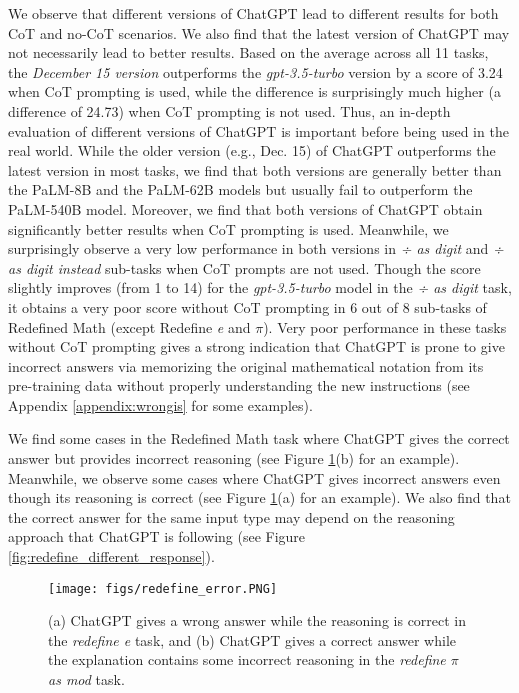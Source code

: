 \documentclass[11pt]{article}
\begin{document}
We observe that different versions of ChatGPT lead to different results for both CoT and no-CoT scenarios. We also find that the latest version of ChatGPT may not necessarily lead to better results. Based on the average across all 11 tasks, the \textit{December 15 version} outperforms the \textit{gpt-3.5-turbo} version by a score of 3.24 when CoT prompting is used, while the difference is surprisingly much higher (a difference of 24.73) when CoT prompting is not used. Thus, an in-depth evaluation of different versions of ChatGPT is important before being used in the real world. While the older version (e.g., Dec. 15) of ChatGPT outperforms the latest version in most tasks, we find that both versions are generally better than the PaLM-8B and the PaLM-62B models but usually fail to outperform the PaLM-540B model. Moreover, we find that both versions of ChatGPT obtain significantly better results when CoT prompting is used. Meanwhile, we surprisingly observe a very low performance in both versions in \textit{÷ as digit} and \textit{÷ as digit instead} sub-tasks when CoT prompts are not used. Though the score slightly improves (from 1 to 14) for the \textit{gpt-3.5-turbo} model in the \textit{÷ as digit} task, it obtains a very poor score without CoT prompting in 6 out of 8 sub-tasks of Redefined Math (except Redefine \textit{e} and $\pi$). Very poor performance in these tasks without CoT prompting gives a strong indication that ChatGPT is prone to give incorrect answers via memorizing the original mathematical notation from its pre-training data without properly understanding the new instructions (see Appendix \ref{appendix:wrongis} for some examples). 

We find some cases in the Redefined Math task where ChatGPT gives the correct answer but provides incorrect reasoning (see Figure \ref{fig:redefine_error}(b) for an example). Meanwhile, we observe some cases where ChatGPT gives incorrect answers even though its reasoning is correct (see Figure \ref{fig:redefine_error}(a) for an example). We also find that the correct answer for the same input type may depend on the reasoning approach that ChatGPT is following (see Figure \ref{fig:redefine_different_response}). 



\begin{figure}[t!]

\begin{center}
\texttt{[image: figs/redefine\_error.PNG]}
\caption[overview]{
\small{(a) ChatGPT gives a wrong answer while the reasoning is correct in the \textit{redefine e} task, and (b) ChatGPT gives a correct answer while the explanation contains some incorrect reasoning in the \textit{redefine $\pi$ as mod} task.} }
\label{fig:redefine_error}
\end{center}
\vspace{-.2cm}
\end{figure}
\end{document}

